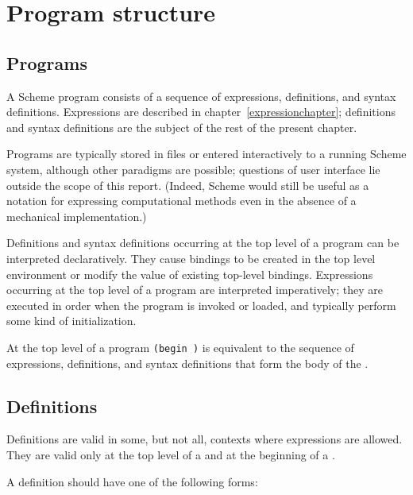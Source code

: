 \chapter{Program structure}
\label{programchapter}

\section{Programs}

A Scheme program consists of a sequence of expressions, definitions,
and syntax definitions.
Expressions are described in chapter~\ref{expressionchapter};
definitions and syntax definitions are the subject of the rest of the
present chapter.

Programs are typically stored in files or entered interactively to a
running Scheme system, although other paradigms are possible;
questions of user interface lie outside the scope of this report.
(Indeed, Scheme would still be useful as a notation for expressing
computational methods even in the absence of a mechanical
implementation.)

Definitions and syntax definitions occurring at the top level of a program
can be interpreted
declaratively.
They cause bindings to be created in the top level
environment or modify the value of existing top-level bindings.
Expressions occurring at the top level of a program are
interpreted imperatively; they are executed in order when the program is
invoked or loaded, and typically perform some kind of initialization.

At the top level of a program {\tt(begin  \dotsfoo)} is
equivalent to the sequence of expressions, definitions, and syntax definitions
that form the body of the .


\section{Definitions}
\label{defines}

Definitions are valid in some, but not all, contexts where expressions
are allowed.  They are valid only at the top level of a 
and at the beginning of a .

A definition should have one of the following forms:

